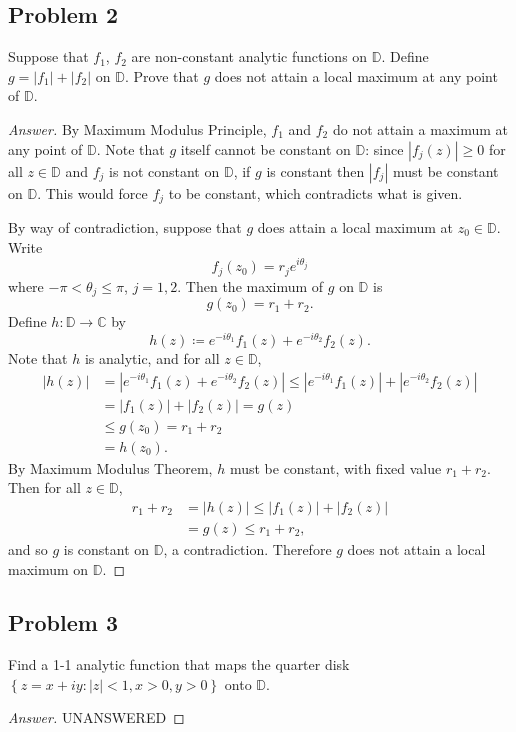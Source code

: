 \documentclass[12pt]{article}
\newcommand{\cx}{\mathbb{C}}
\newcommand\paren[1]{\left( #1 \right)}
\newcommand\setb[1]{\left \{ #1 \right \}}
\newcommand{\abs}[1]{\left| #1 \right|}
\theoremstyle{definition}
\begin{document}
\subsection{Problem 2 \texorpdfstring{\cite{Nguyen}}{}}
Suppose that $f_1$, $f_2$ are non-constant analytic functions on $\mathbb{D}$. Define $g = \abs{f_1} + \abs{f_2}$ on $\mathbb{D}$. Prove that $g$ does not attain a local maximum at any point of $\mathbb{D}$.
\begin{proof}[Answer]
    By Maximum Modulus Principle, $f_1$ and $f_2$ do not attain a maximum at any point of $\mathbb{D}$. Note that $g$ itself cannot be constant on $\mathbb{D}$: since $\abs{ f_j(z) } \geq 0$ for all $z \in \mathbb{D}$ and $f_j$ is not constant on $\mathbb{D}$, if $g$ is constant then $\abs{ f_j }$ must be constant on $\mathbb{D}$. This would force $f_j$ to be constant, which contradicts what is given. 
    
    By way of contradiction, suppose that $g$ does attain a local maximum at $z_0 \in \mathbb{D}$. Write
    \[
        f_j \paren{ z_0 } = r_j e^{i \theta_j}
    \]
    where $-\pi < \theta_j \leq \pi$, $j = 1,2$. Then the maximum of $g$ on $\mathbb{D}$ is 
    \[
        g \paren{ z_0 } = r_1 + r_2.
    \]
    Define $h : \mathbb{D} \to \cx$ by
    \[
        h(z) \coloneqq e^{-i \theta_1} f_1(z) + e^{-i \theta_2} f_2(z).
    \]
    Note that $h$ is analytic, and for all $z \in \mathbb{D}$,
    \begin{align*}
        \abs{ h(z) } & = \abs{ e^{-i \theta_1} f_1(z) + e^{-i \theta_2} f_2(z) } \leq \abs{ e^{-i \theta_1} f_1(z) } + \abs{ e^{-i \theta_2} f_2(z) } \\
        & = \abs{ f_1(z) } + \abs{ f_2(z) } = g(z) \\
        & \leq g \paren{ z_0 } = r_1 + r_2 \\
        & = h \paren{ z_0 } .
    \end{align*}
    By Maximum Modulus Theorem, $h$ must be constant, with fixed value $r_1 + r_2$. Then for all $z \in \mathbb{D}$,
    \begin{align*}
        r_1 + r_2 & = \abs{ h(z) } \leq \abs{ f_1(z) } + \abs{ f_2(z) } \\
        & = g(z) \leq r_1 + r_2,
    \end{align*}
    and so $g$ is constant on $\mathbb{D}$, a contradiction. Therefore $g$ does not attain a local maximum on $\mathbb{D}$.
\end{proof}
\subsection{Problem 3}
Find a 1-1 analytic function that maps the quarter disk $\setb{ z = x + iy : |z| < 1, x > 0 , y > 0 }$ onto $\mathbb{D}$.
\begin{proof}[Answer]
    UNANSWERED
\end{proof}
\end{document}
